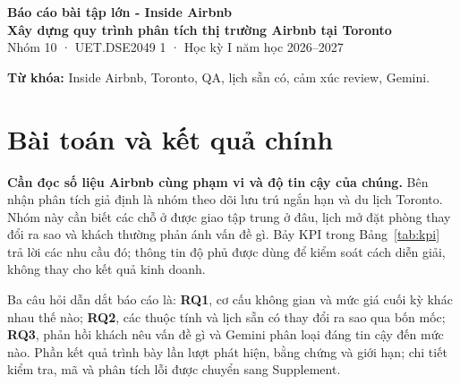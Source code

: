 \documentclass[11pt,a4paper]{article}
\begin{document}
\begin{center}
{\large\bfseries Báo cáo bài tập lớn - Inside Airbnb}\\[3pt]
{\Large\bfseries Xây dựng quy trình phân tích thị trường Airbnb tại Toronto}\\[5pt]
{\normalsize Nhóm 10 · UET.DSE2049 1 · Học kỳ I năm học 2026--2027}
\end{center}
\vspace{-5pt}
\begin{abstract}
\noindent\textbf{Nhóm mẫu có nguồn cung ổn định, nhưng lịch sẵn có và phản hồi khách cho thấy những khác biệt cần theo dõi.} Trên 1.000 chỗ ở được giao tại Toronto qua bốn mốc, toàn bộ mã chỗ ở vẫn hiện diện; 87,5\% là toàn bộ nhà/căn hộ. Ở mốc cuối, trung vị giá niêm yết là \GlobalMedian{} CAD/đêm trên 980 chỗ ở có giá. Tỷ lệ lịch sẵn có 90 ngày giảm từ 66,53\% ở mốc tháng 12/2025 xuống 51,59\% ở mốc tháng 6/2026. Gemini gán 64/1.000 review là mixed hoặc negative; tiện nghi là khía cạnh bị chê nhiều nhất. Trên cùng 100 nhãn tay, Gemini đạt accuracy 96\% và macro-F1 0,8594, so với 95\% và 0,8278 của baseline. Tuy vậy, Gemini chỉ nhận đúng 3/7 review mixed. Kết quả mô tả mẫu được giao, không suy rộng thành nguồn cung, mức độ hài lòng hay tỷ lệ lấp đầy của toàn Toronto.
\end{abstract}
\vspace{-3pt}
\noindent\textbf{Từ khóa:} Inside Airbnb, Toronto, QA, lịch sẵn có, cảm xúc review, Gemini.

\section{Bài toán và kết quả chính}
\textbf{Cần đọc số liệu Airbnb cùng phạm vi và độ tin cậy của chúng.} Bên nhận phân tích giả định là nhóm theo dõi lưu trú ngắn hạn và du lịch Toronto. Nhóm này cần biết các chỗ ở được giao tập trung ở đâu, lịch mở đặt phòng thay đổi ra sao và khách thường phản ánh vấn đề gì. Bảy KPI trong Bảng~\ref{tab:kpi} trả lời các nhu cầu đó; thông tin độ phủ được dùng để kiểm soát cách diễn giải, không thay cho kết quả kinh doanh.

Ba câu hỏi dẫn dắt báo cáo là: \textbf{RQ1}, cơ cấu không gian và mức giá cuối kỳ khác nhau thế nào; \textbf{RQ2}, các thuộc tính và lịch sẵn có thay đổi ra sao qua bốn mốc; \textbf{RQ3}, phản hồi khách nêu vấn đề gì và Gemini phân loại đáng tin cậy đến mức nào. Phần kết quả trình bày lần lượt phát hiện, bằng chứng và giới hạn; chi tiết kiểm tra, mã và phân tích lỗi được chuyển sang Supplement.
\end{document}
